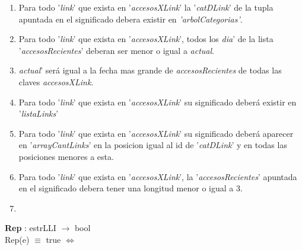\documentclass[10pt, a4paper]{article}
\begin{document}
	  \begin{enumerate}
	
		\item Para todo '\textit{link}' que exista en '\textit{accesosXLink}' la '\textit{catDLink}' de la tupla apuntada en el significado debera existir en \textit{'arbolCategorias'}.
	  
		\item Para todo '\textit{link}' que exista en '\textit{accesosXLink}', todos los \textit{dia}' de la lista '\textit{accesosRecientes}' deberan ser menor o igual a \textit{actual}.
		
		\item \textit{actual}' será igual a la fecha mas grande de  \textit{accesosRecientes} de todas las claves \textit{accesosXLink}.

		\item Para todo '\textit{link}' que exista en '\textit{accesosXLink}' su significado deberá existir en '\textit{listaLinks}' 

		\item Para todo '\textit{link}' que exista en '\textit{accesosXLink}' su significado deberá aparecer en '\textit{arrayCantLinks}' en la posicion igual al id de '\textit{catDLink}' y en todas las posiciones menores a esta.

		\item Para todo '\textit{link}' que exista en '\textit{accesosXLink}', la '\textit{accesosRecientes}' apuntada en el significado debera tener una longitud menor o igual a 3.

		\item 
	  
	  \end{enumerate}
	 
	
	   \textbf{Rep} : estrLLI $\longrightarrow$ bool\\
	        Rep(e) $\equiv$ true $\Longleftrightarrow$\\
	
\end{document}
